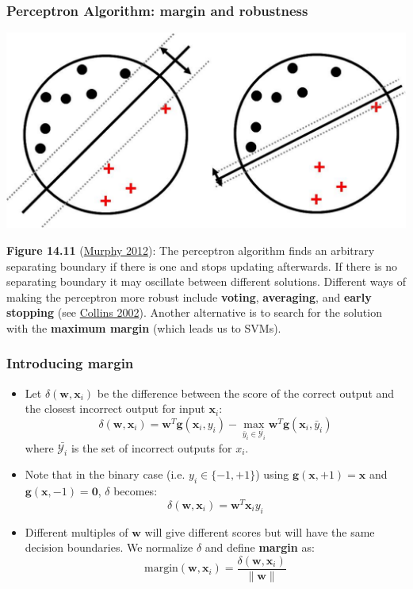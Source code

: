 \documentclass[ignorenonframetext,plain,fleqn]{beamer}
\renewcommand{\vec}{\mathbf}
\begin{document}
\begin{frame}\frametitle{Perceptron Algorithm: margin and robustness}
\begin{center}
\includegraphics[width=\textwidth]{images/largeMarginPrinciple2.pdf}
\end{center}\footnotesize
{\bf Figure 14.11} (\href{http://www.cs.ubc.ca/~murphyk/MLbook}{Murphy
  2012}): The perceptron algorithm finds an arbitrary separating
boundary if there is one and stops updating afterwards.  If there is
no separating boundary it may oscillate between different solutions.
Different ways of making the perceptron more robust include {\bf voting},
{\bf averaging}, and {\bf early stopping} (see
\href{http://aclweb.org/anthology//W/W02/W02-1001.pdf}{Collins 2002}).
Another alternative is to search for the solution with the {\bf
  maximum margin} (which leads us to SVMs).
\end{frame}

\begin{frame}\frametitle{Introducing margin}
\begin{itemize}
\item Let $\delta(\vec{w},\vec{x}_i)$ be the difference between the
  score of the correct output and the closest incorrect output for
  input $\vec{x}_i$:
\[
  \delta(\vec{w}, \vec{x}_i) =
  \vec{w}^T\vec{g}(\vec{x}_i,y_i) - \max_{\bar{y}_i \in 
    \bar{\mathcal{Y}_i}} \vec{w}^T\vec{g}(\vec{x}_i,\bar{y}_i)
\]
where $\bar{\mathcal{Y}_i}$ is the set of incorrect outputs for $x_i$.
\item Note that in the binary case (i.e. $y_i\in\{-1,+1\}$) using 
$\vec{g}(\vec{x},+1)=\vec{x}$ and $\vec{g}(\vec{x},-1)=\vec{0}$,
$\delta$ becomes:
\[
  \delta(\vec{w}, \vec{x}_i) = \vec{w}^T\vec{x}_i y_i
\]
\item Different multiples of $\vec{w}$ will give different scores but
  will have the same decision boundaries.  We normalize $\delta$ and
  define {\bf margin} as:
\[
  \text{margin}(\vec{w},\vec{x}_i) = \frac{\delta(\vec{w},\vec{x}_i)}{\|\vec{w}\|}
\]
\end{itemize}
\end{frame}
\end{document}
